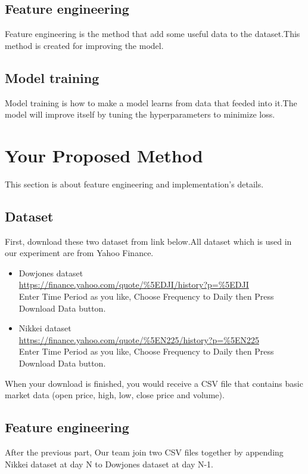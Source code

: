 \documentclass{article}
\begin{document}
\subsection{Feature engineering}
Feature engineering is the method that add some useful data to the dataset.This method is created for improving the model.

\subsection{Model training}
Model training is how to make a model learns from data that feeded into it.The model will improve itself by tuning the hyperparameters to minimize loss.

\section{Your Proposed Method}\label{sec:yourmethod}
This section is about feature engineering and implementation's details.

\subsection{Dataset}
First, download these two dataset from link below.All dataset which is used in our experiment are from Yahoo Finance.

\begin{itemize}
\item Dowjones dataset\\
\url{https://finance.yahoo.com/quote/%5EDJI/history?p=%5EDJI}
\\Enter Time Period as you like, Choose Frequency to Daily then Press Download Data button.

\item Nikkei dataset\\
\url{https://finance.yahoo.com/quote/%5EN225/history?p=%5EN225}
\\Enter Time Period as you like, Choose Frequency to Daily then Press Download Data button.
\end{itemize}

When your download is finished, you would receive a CSV file that contains basic market data (open price, high, low, close price and volume).


\subsection{Feature engineering}
After the previous part, Our team join two CSV files together by appending Nikkei dataset at day N to Dowjones dataset at day N-1.
\end{document}
